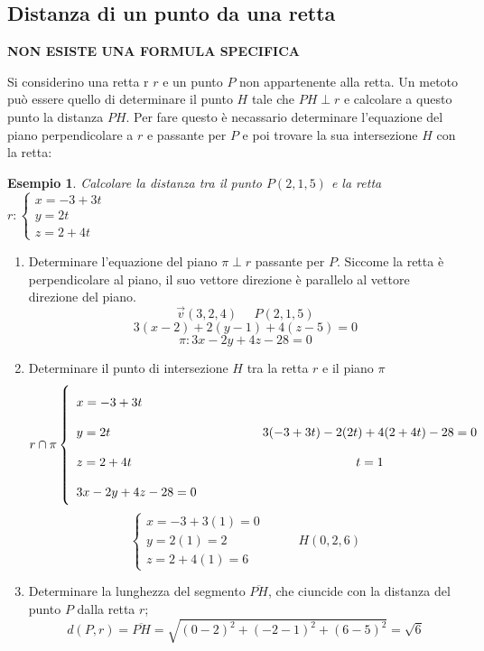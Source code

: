 \documentclass{article}     %
\newtheorem{ex}{Esempio}[section]
\begin{document}
        \subsection{Distanza di un punto da una retta}
            \textbf{NON ESISTE UNA FORMULA SPECIFICA}

            Si considerino una retta r $r$ e un punto $P$ non appartenente alla retta. Un metoto può essere quello di determinare il punto $H$ tale che $PH\perp r$ e calcolare a questo punto la distanza $PH$. Per fare questo è necassario determinare l'equazione del piano perpendicolare a $r$ e passante per $P$ e poi trovare la sua intersezione $H$ con la retta:

            \begin{ex}
                Calcolare la distanza tra il punto $P(2,1,5)$ e la retta $r: \left\{\begin{array}{l}
                    x=-3+3t\\
                    y=2t\\
                    z=2+4t
                \end{array}\right.$
            \end{ex}
            \begin{enumerate}
                \item Determinare l'equazione del piano $\pi\perp r$ passante per $P$. Siccome la retta è perpendicolare al piano, il suo vettore direzione è parallelo al vettore direzione del piano.
                    \[\overrightarrow{v}(3,2,4)~~~~~~P(2,1,5)\]
                    \[3(x-2)+2(y-1)+4(z-5)=0\]
                    \[\pi: 3x-2y+4z-28=0\]
                \item Determinare il punto di intersezione $H$ tra la retta $r$ e il piano $\pi$
                    \[r\cap\pi\left\{\begin{array}{l}
                        x=-3+3t\\
                        y=2t\\
                        z=2+4t\\
                        3x-2y+4z-28=0
                    \end{array}\right.~~~~~~~~~~~~\renewcommand{\arraystretch}{2}\begin{array}{c}
                        3(-3+3t)-2(2t)+4(2+4t)-28=0\\
                        t=1
                    \end{array}\]
                    \[\left\{\begin{array}{l}
                        x=-3+3(1)=0\\
                        y=2(1)=2\\
                        z=2+4(1)=6
                    \end{array}\right.~~~~~~~~~~~~H(0,2,6)\]
                \item Determinare la lunghezza del segmento $\overline{PH}$, che ciuncide con la distanza del punto $P$ dalla retta $r$;
                    \[d(P,r)=\overline{PH}=\sqrt{(0-2)^2+(-2-1)^2+(6-5)^2}=\sqrt{6}\]
            \end{enumerate}
\end{document}
